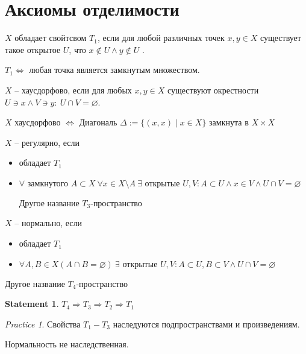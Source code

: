 \documentclass[11pt]{book}
\theoremstyle{definition}
\theoremstyle{plain}
\theoremstyle{plain}
\newtheorem*{st}{Statement}
\theoremstyle{definition}
\theoremstyle{remark}
\newtheorem*{prac}{Practice}
\begin{document}
\section{Аксиомы отделимости}
\begin{defn}
    $ X$ обладает свойтсвом $ T_1$, если для любой различных точек $ x, y \in X$ существует такое открытое $ U$, что $ x \not\in U \wedge y \not\in U$ .
\end{defn}
\begin{thm}
    $ T_1 \Longleftrightarrow $  любая точка является замкнутым множеством.
\end{thm}
\begin{defn}
    $ X$ -- хаусдорфово, если для любых $ x, y \in  X$ существуют окрестности $ U \ni x \wedge V \ni y: ~ U \cap V = \varnothing$.
\end{defn}
\begin{defn}
    $ X$ хаусдорфово $ \Longleftrightarrow $ Диагональ $ \Delta := \{(x, x) \mid x \in  X\}$ замкнута в $ X \times X$
\end{defn}
\begin{defn}
    $ X$ -- регулярно, если 
    \begin{itemize}
	\item обладает $ T_1$
	\item $ \forall  \text{ замкнутого }A \subset X~ \forall x \in  X \setminus A~ \exists \text{ открытые } U, V : A \subset  U \wedge x \in V \wedge U \cap  V = \varnothing $

	    Другое название $ T_3$-пространство
    \end{itemize}
\end{defn}
\begin{defn}
    $ X$ -- нормально, если 
    \begin{itemize}
        \item обладает $ T_1$ 
	\item $ \forall  A, B \in  X (A \cap  B = \varnothing) ~ \exists  \text{ открытые } U, V: A \subset U,  B  \subset V  \wedge U \cap  V= \varnothing$
	\end{itemize}

	    Другое название $ T_4$-пространство
\end{defn}
\begin{st}
    $ T_4 \Rightarrow T_3 \Rightarrow  T_2 \Rightarrow T_1$
\end{st}
\begin{prac}
    Свойства $ T_1 - T_3$ наследуются подпространствами и произведениям.

    Нормальность не наследственная.
\end{prac}
\end{document}
